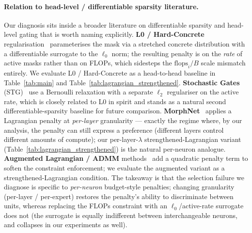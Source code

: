 \documentclass[fleqn,10pt]{article}
\begin{document}
\paragraph{Relation to head-level / differentiable sparsity literature.}
Our diagnosis sits inside a broader literature on differentiable
sparsity and head-level gating that is worth naming explicitly.
\textbf{L0 / Hard-Concrete} regularisation~\citep{louizos2018learning}
parameterises the mask via a stretched concrete distribution with a
differentiable surrogate to the $\ell_0$ norm; the resulting penalty
is on the \emph{rate} of active masks rather than on FLOPs, which
sidesteps the $\mathrm{flops}_i/B$ scale mismatch entirely. We
evaluate L0 / Hard-Concrete as a head-to-head baseline in
Table~\ref{tab:main} and Table~\ref{tab:lagrangian_strengthened}.
\textbf{Stochastic Gates} (STG)~\citep{yamada2020stg} use a Bernoulli
relaxation with a separate $\ell_2$ regulariser on the active rate,
which is closely related to L0 in spirit and stands as a natural
second differentiable-sparsity baseline for future comparison. \textbf{MorphNet}~\citep{gordon2018morphnet}
applies a Lagrangian penalty at \emph{per-layer} granularity --- exactly
the regime where, by our analysis, the penalty can still express a
preference (different layers control different amounts of compute);
our per-layer-$\lambda$ strengthened-Lagrangian variant
(Table~\ref{tab:lagrangian_strengthened}) is the natural per-neuron
analogue. \textbf{Augmented Lagrangian / ADMM}
methods~\citep{boyd2011admm,zhang2018admm,bertsekas1996constrained,
nocedal2006numerical} add a quadratic penalty term to soften the
constraint enforcement; we evaluate the augmented variant as a
strengthened-Lagrangian condition. The takeaway is that the
selection failure we diagnose is specific to \emph{per-neuron}
budget-style penalties; changing granularity (per-layer /
per-expert) restores the penalty's ability to discriminate between
units, whereas replacing the FLOPs constraint with an
$\ell_0$/active-rate surrogate does not (the surrogate is equally
indifferent between interchangeable neurons, and collapses in our
experiments as well).
\end{document}
